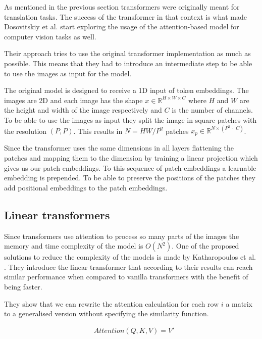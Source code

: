 As mentioned in the previous section transformers were originally meant for translation tasks. The success of the transformer in that context is what made Dosovitskiy et al. \cite{dosovitskiy_image_2021} start exploring the usage of the attention-based model for computer vision tasks as well.

Their approach tries to use the original transformer implementation as much as possible. This means that they had to introduce an intermediate step to be able to use the images as input for the model.

The original model is designed to receive a 1D input of token embeddings. The images are 2D and each image has the shape $x \in \mathbb{R}^{H \times W \times C}$ where $H$ and $W$ are the height and width of the image respectively and $C$ is the number of channels. To be able to use the images as input they split the image in square patches with the resolution $(P, P)$. This results in $N = HW/P^2$ patches $x_p \in \mathbb{R}^{N \times (P^2 \; \cdot \; C)}$.

Since the transformer uses the same dimensions in all layers flattening the patches and mapping them to the dimension by training a linear projection which gives us our patch embeddings. To this sequence of patch embeddings a learnable embedding is prepended. To be able to preserve the positions of the patches they add positional embeddings to the patch embeddings.

\subsection{Linear transformers}
\label{sec:prelim:transformers:linear}

Since transformers use attention to process so many parts of the images the memory and time complexity of the model is $O(N^2)$. One of the proposed solutions to reduce the complexity of the models is made by Katharopoulos et al. \cite{katharopoulos_transformers_2020}. They introduce the linear transformer that according to their results can reach similar performance when compared to vanilla transformers with the benefit of being faster. 

They show that we can rewrite the attention calculation for each row $i$ a matrix to a generalised version without specifying the similarity function.

\begin{align}
&Attention(Q, K, V) = V'
\end{align}


